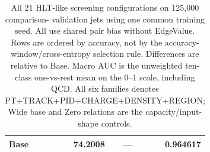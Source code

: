 \begin{table}[htbp]
\begin{tabularx}{\linewidth}{@{}Xrrr@{}}
Base & 74.2008 & --- & 0.964617 \\ %
\bottomrule
\end{tabularx}
\caption{All 21 HLT-like screening configurations on 125,000 comparison-
validation jets using one common training seed. All use shared pair bias without EdgeValue.
Rows are ordered by accuracy, not by the accuracy-window/cross-entropy
selection rule. Differences are relative to Base. Macro AUC is the
unweighted ten-class one-vs-rest mean on the 0--1 scale, including QCD.
All six families denotes PT+TRACK+PID+CHARGE+DENSITY+REGION; Wide base
and Zero relations are the capacity/input-shape controls.}
\label{tab:hlt-screening-results}
\end{table}
